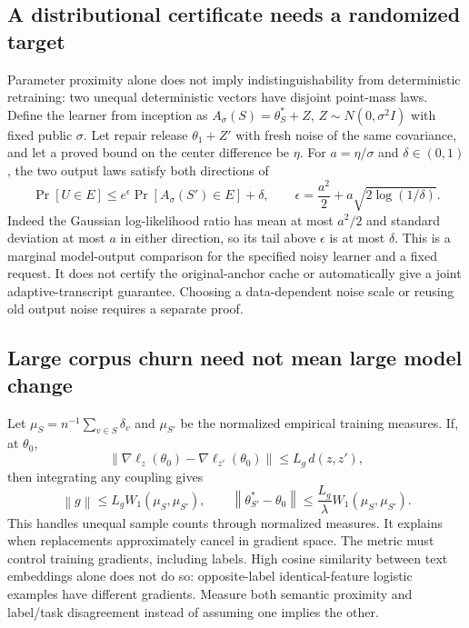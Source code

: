 \documentclass[11pt,a4paper]{article}
\theoremstyle{definition}\newtheorem{definition}[theorem]{Definition}
\newcommand{\norm}[1]{\left\lVert #1\right\rVert}
\begin{document}
\subsection{A distributional certificate needs a randomized target}
Parameter proximity alone does not imply indistinguishability from deterministic retraining: two unequal deterministic vectors have disjoint point-mass laws. Define the learner from inception as
$A_\sigma(S)=\theta^*_S+Z$, $Z\sim N(0,\sigma^2I)$ with fixed public $\sigma$. Let repair release $\theta_1+Z'$ with fresh noise of the same covariance, and let a proved bound on the center difference be $\eta$. For $a=\eta/\sigma$ and $\delta\in(0,1)$, the two output laws satisfy both directions of
\begin{equation}
 \Pr[U\in E]\le e^\epsilon\Pr[A_\sigma(S')\in E]+\delta,
 \qquad \epsilon=\frac{a^2}{2}+a\sqrt{2\log(1/\delta)}.
\end{equation}
Indeed the Gaussian log-likelihood ratio has mean at most $a^2/2$ and standard deviation at most $a$ in either direction, so its tail above $\epsilon$ is at most $\delta$. This is a marginal model-output comparison for the specified noisy learner and a fixed request. It does not certify the original-anchor cache or automatically give a joint adaptive-transcript guarantee. Choosing a data-dependent noise scale or reusing old output noise requires a separate proof.

\subsection{Large corpus churn need not mean large model change}
Let $\mu_S=n^{-1}\sum_{v\in S}\delta_v$ and $\mu_{S'}$ be the normalized empirical training measures. If, at $\theta_0$,
\[
 \norm{\nabla\ell_z(\theta_0)-\nabla\ell_{z'}(\theta_0)}
 \le L_g\,d(z,z'),
\]
then integrating any coupling gives
\begin{equation}
 \norm g\le L_g W_1(\mu_S,\mu_{S'}),\qquad
 \norm{\theta^*_{S'}-\theta_0}\le\frac{L_g}{\lambda}W_1(\mu_S,\mu_{S'}).
\end{equation}
This handles unequal sample counts through normalized measures. It explains when replacements approximately cancel in gradient space. The metric must control training gradients, including labels. High cosine similarity between text embeddings alone does not do so: opposite-label identical-feature logistic examples have different gradients. Measure both semantic proximity and label/task disagreement instead of assuming one implies the other.
\end{document}
